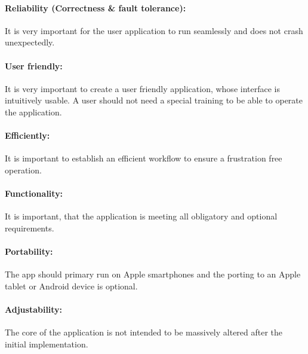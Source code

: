 \paragraph{Reliability (Correctness \& fault tolerance):}

It is very important for the user application to run seamlessly and does not crash unexpectedly.

\paragraph{User friendly:}

It is very important to create a user friendly application, whose interface is intuitively usable. A user should not need a special training to be able to operate the application.

\paragraph{Efficiently:}

It is important to establish an efficient workflow to ensure a frustration free operation. 

\paragraph{Functionality:}

It is important, that the application is meeting all obligatory and optional requirements.

\paragraph{Portability:}

The app should primary run on Apple smartphones and the porting to an Apple tablet or Android device is optional.

\paragraph{Adjustability:}

The core of the application is not intended to be massively altered after the initial implementation.  

